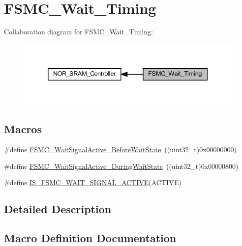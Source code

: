 \hypertarget{group___f_s_m_c___wait___timing}{}\section{F\+S\+M\+C\+\_\+\+Wait\+\_\+\+Timing}
\label{group___f_s_m_c___wait___timing}
Collaboration diagram for F\+S\+M\+C\+\_\+\+Wait\+\_\+\+Timing\+:
\nopagebreak
\begin{figure}[H]
\begin{center}
\leavevmode
\includegraphics[width=338pt]{group___f_s_m_c___wait___timing}
\end{center}
\end{figure}
\subsection*{Macros}
\begin{DoxyCompactItemize}
\item 
\#define \hyperlink{group___f_s_m_c___wait___timing_ga62c6855a7cc65b20024085f09cdc65e8}{F\+S\+M\+C\+\_\+\+Wait\+Signal\+Active\+\_\+\+Before\+Wait\+State}~((uint32\+\_\+t)0x00000000)
\item 
\#define \hyperlink{group___f_s_m_c___wait___timing_gae905fc59e5d99091d132d7c221c8b6d4}{F\+S\+M\+C\+\_\+\+Wait\+Signal\+Active\+\_\+\+During\+Wait\+State}~((uint32\+\_\+t)0x00000800)
\item 
\#define \hyperlink{group___f_s_m_c___wait___timing_ga3edb40c756afa8bb78550b7e22ded093}{I\+S\+\_\+\+F\+S\+M\+C\+\_\+\+W\+A\+I\+T\+\_\+\+S\+I\+G\+N\+A\+L\+\_\+\+A\+C\+T\+I\+VE}(A\+C\+T\+I\+VE)
\end{DoxyCompactItemize}


\subsection{Detailed Description}


\subsection{Macro Definition Documentation}
\mbox{\label{group___f_s_m_c___wait___timing_ga62c6855a7cc65b20024085f09cdc65e8}} 
